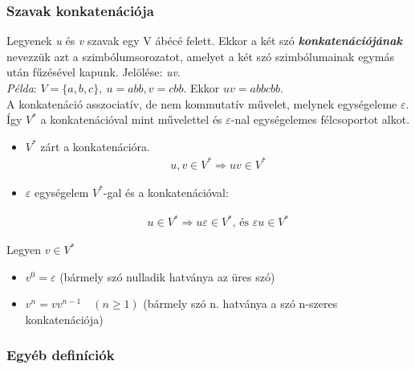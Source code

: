 \documentclass[12pt,margin=0px]{article}
\begin{document}
    \subsubsection*{Szavak konkatenációja\\}

    \noindent Legyenek \emph{u} és \emph{v} szavak egy V ábécé felett. Ekkor a két szó \textbf{\emph{konkatenációjának}} nevezzük azt a szimbólumsorozatot, amelyet a két szó szimbólumainak egymás után fűzésével kapunk. Jelölése: \emph{uv}.\\

    \noindent \emph{Példa}: $V = \{a,b,c\},\ u = abb, v = cbb$. Ekkor $uv = abbcbb$.\\
						
    \noindent A konkatenáció asszociatív, de nem kommutatív művelet, melynek egységeleme $\varepsilon$.\\

    \noindent Így $V^{*}$ a konkatenációval mint művelettel és $\varepsilon$-nal egységelemes félcsoportot alkot.
    \begin{itemize}						
    	\item \noindent $V^*$ zárt a konkatenációra.
    	\begin{align*}
            u,v \in V^* \Rightarrow uv \in V^*
    	\end{align*}

    	\item $\varepsilon$ egységelem $V^*$-gal és a konkatenációval:

    	\begin{align*}
    		u \in V^* \Rightarrow u\varepsilon \in V^* \textrm{, és }\varepsilon u \in V^*
    	\end{align*}
    \end{itemize}

    \noindent Legyen $v \in V^{*}$
    \begin{itemize}
      \item $v^{0} = \varepsilon$ (bármely szó nulladik hatványa az üres szó)
      \item $v^{n} = vv^{n-1}\quad (n \geq 1)$ (bármely szó n. hatványa a szó n-szeres konkatenációja)
    \end{itemize}

	\subsubsection*{Egyéb definíciók}
	
\end{document}

